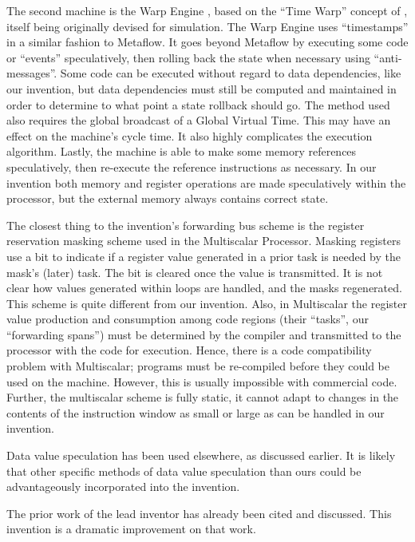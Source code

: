 \documentclass[10pt,dvips]{article}
\begin{document}
The second machine is the Warp Engine
\cite{Cleary95}, based on the ``Time Warp''
concept of \cite{Jefferson85}, itself
being originally
devised for simulation. The Warp Engine uses ``timestamps'' in
a similar fashion to Metaflow. It goes beyond Metaflow by
executing some code or ``events'' speculatively, then rolling
back the state when necessary using ``anti-messages''. Some
code can be executed without regard to data dependencies, like
our invention, but data dependencies must still be computed and
maintained in order to determine to what point a state
rollback should go. The method used also requires the global
broadcast of a Global Virtual Time. This may have an effect on
the machine's cycle time. It also highly complicates the execution
algorithm. Lastly, the machine is able to make some memory
references speculatively, then re-execute the reference instructions
as necessary. In our invention both memory and register operations
are made speculatively within the processor, but the external memory
always contains correct state.

The closest thing to the invention's forwarding bus scheme is the
register reservation masking scheme used in the Multiscalar
Processor\cite{Sohi95}. Masking registers use a bit to indicate if
a register value generated in a prior task is needed by the mask's
(later) task. The bit is cleared once the value is transmitted.
It is not clear how values generated within loops are handled,
and the masks regenerated.
This scheme is quite different from our invention. Also, in Multiscalar
the register value production and consumption among code regions
(their ``tasks'', our ``forwarding spans'') must be determined by
the compiler and transmitted to the processor with the code for
execution. Hence, there is a code compatibility problem with
Multiscalar; programs must be re-compiled before they could be used
on the machine. However, this is usually impossible with commercial
code. Further, the multiscalar scheme is fully static, it cannot adapt
to changes in the contents of the instruction window as small or
large as can be handled in our invention.

Data value speculation has been used elsewhere, as discussed earlier.
It is likely that other specific methods of data value speculation
than ours could be advantageously incorporated into the invention.

The prior work of the lead inventor has already been cited and discussed.
This invention is a dramatic improvement on that work.
\end{document}
